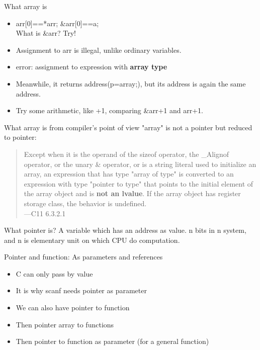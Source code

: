 \documentclass{beamer}
\begin{document}
\begin{frame}{What array is}
  \begin{itemize}
    \item <1->   
    arr[0]==*arr; \&arr[0]==a;\\
    What is \&arr? Try!
    \item <2->
    Assignment to arr is illegal, unlike ordinary variables. 
    \item<3-> error: assignment to expression with \textbf{array type}
    \item <4-> Meanwhile, it returns address(p=array;), but its address is again the same address.
    \item <5-> Try some arithmetic, like +1, comparing \&arr+1 and arr+1.
  \end{itemize}
 
\end{frame}

\begin{frame}{What array is from compiler's point of view}
  "array" is not a pointer but reduced to pointer:
  \begin{quote}
    Except when it is the operand of the sizeof operator, the \_Alignof operator, or the unary \& operator, or is a string literal used to initialize an array, an expression that has type "array of type" is converted to an expression with type "pointer to type" that points to the initial element of the array object and is \textbf{not an lvalue}. If the array object has register storage class, the behavior is undefined.
    \\     ---C11 6.3.2.1
  \end{quote}
\end{frame}

\begin{frame}{What pointer is?}
A variable which has an address as value. n bits in n system, and n is elementary unit on which CPU do computation.

\end{frame}

\begin{frame}{Pointer and function: As parameters and references}
  \begin{itemize}
    \item <1-> C can only pass by value
    \item <2-> It is why scanf needs pointer as parameter
    \item <3-> We can also have pointer to function 
    \item <4-> Then pointer array to functions
    \item <5-> Then pointer to function as parameter (for a general function)
  \end{itemize}
\end{frame}
\end{document}

